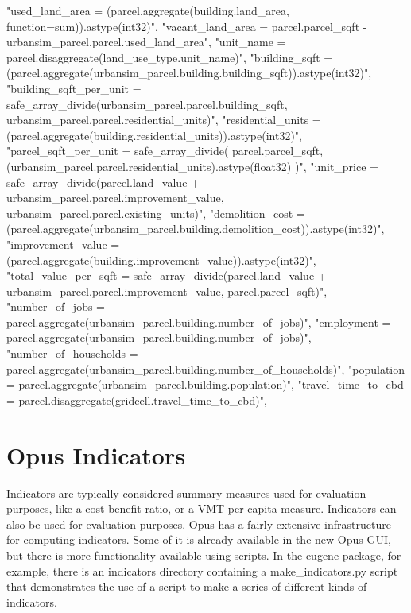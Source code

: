 "used_land_area = (parcel.aggregate(building.land_area, function=sum)).astype(int32)",
"vacant_land_area = parcel.parcel_sqft - urbansim_parcel.parcel.used_land_area",
"unit_name = parcel.disaggregate(land_use_type.unit_name)",
"building_sqft = (parcel.aggregate(urbansim_parcel.building.building_sqft)).astype(int32)",
"building_sqft_per_unit = safe_array_divide(urbansim_parcel.parcel.building_sqft, urbansim_parcel.parcel.residential_units)",
"residential_units = (parcel.aggregate(building.residential_units)).astype(int32)",       
"parcel_sqft_per_unit = safe_array_divide( parcel.parcel_sqft, (urbansim_parcel.parcel.residential_units).astype(float32) )",
"unit_price = safe_array_divide(parcel.land_value + urbansim_parcel.parcel.improvement_value, urbansim_parcel.parcel.existing_units)",
"demolition_cost = (parcel.aggregate(urbansim_parcel.building.demolition_cost)).astype(int32)",
"improvement_value = (parcel.aggregate(building.improvement_value)).astype(int32)",
"total_value_per_sqft = safe_array_divide(parcel.land_value + urbansim_parcel.parcel.improvement_value, parcel.parcel_sqft)",
"number_of_jobs = parcel.aggregate(urbansim_parcel.building.number_of_jobs)",
"employment = parcel.aggregate(urbansim_parcel.building.number_of_jobs)",
"number_of_households = parcel.aggregate(urbansim_parcel.building.number_of_households)",
"population = parcel.aggregate(urbansim_parcel.building.population)",
"travel_time_to_cbd = parcel.disaggregate(gridcell.travel_time_to_cbd)",       

\section{Opus Indicators}
\label{sec:opus-indicators}

Indicators are typically considered summary measures used for
evaluation purposes, like a cost-benefit ratio, or a VMT per capita
measure.  Indicators can also be used for evaluation purposes.  Opus
has a fairly extensive infrastructure for computing indicators.  Some
of it is already available in the new Opus GUI, but there is more
functionality available using scripts.  In the eugene package, for
example, there is an indicators directory containing a
make\_indicators.py script that demonstrates the use of a script to
make a series of different kinds of indicators.  

